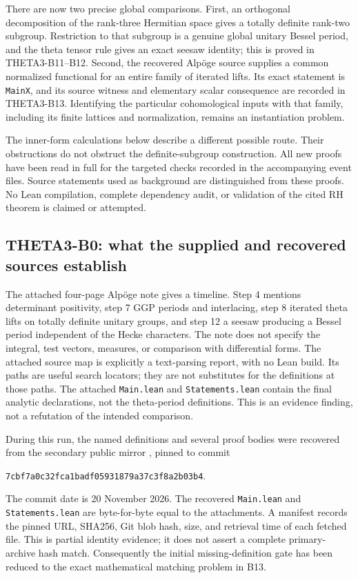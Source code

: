 \documentclass[11pt]{article}
\theoremstyle{definition}\newtheorem{definition}[theorem]{Definition}\newtheorem{remark}[theorem]{Remark}
\begin{document}
There are now two precise global comparisons. First, an orthogonal decomposition of the rank-three Hermitian space gives a totally definite rank-two subgroup. Restriction to that subgroup is a genuine global unitary Bessel period, and the theta tensor rule gives an exact seesaw identity; this is proved in THETA3-B11--B12. Second, the recovered Alp\"oge source supplies a common normalized functional for an entire family of iterated lifts. Its exact statement is \texttt{MainX}, and its source witness and elementary scalar consequence are recorded in THETA3-B13. Identifying the particular cohomological inputs with that family, including its finite lattices and normalization, remains an instantiation problem.

The inner-form calculations below describe a different possible route. Their obstructions do not obstruct the definite-subgroup construction. All new proofs have been read in full for the targeted checks recorded in the accompanying event files. Source statements used as background are distinguished from these proofs. No Lean compilation, complete dependency audit, or validation of the cited RH theorem is claimed or attempted.

\subsection{THETA3-B0: what the supplied and recovered sources establish}\label{B0}

The attached four-page Alp\"oge note gives a timeline. Step 4 mentions determinant positivity, step 7 GGP periods and interlacing, step 8 iterated theta lifts on totally definite unitary groups, and step 12 a seesaw producing a Bessel period independent of the Hecke characters. The note does not specify the integral, test vectors, measures, or comparison with differential forms. The attached source map is explicitly a text-parsing report, with no Lean build. Its paths are useful search locators; they are not substitutes for the definitions at those paths. The attached \texttt{Main.lean} and \texttt{Statements.lean} contain the final analytic declarations, not the theta-period definitions. This is an evidence finding, not a refutation of the intended comparison.

During this run, the named definitions and several proof bodies were recovered from the secondary public mirror , pinned to commit
\begin{center}\small\nolinkurl{7cbf7a0c32fca1badf05931879a37c3f8a2b03b4}.\end{center}
The commit date is 20 November 2026. The recovered \texttt{Main.lean} and \texttt{Statements.lean} are byte-for-byte equal to the attachments. A manifest records the pinned URL, SHA256, Git blob hash, size, and retrieval time of each fetched file. This is partial identity evidence; it does not assert a complete primary-archive hash match. Consequently the initial missing-definition gate has been reduced to the exact mathematical matching problem in B13.
\end{document}
